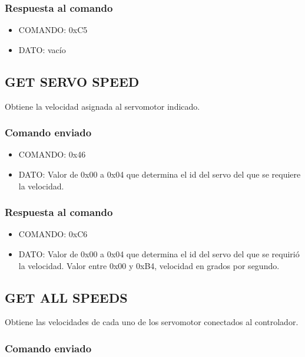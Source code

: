 \documentclass[a4paper,10pt]{article}
\begin{document}
\subsubsection*{Respuesta al comando}

\begin{itemize}
	\item{COMANDO:} 0xC5
	\item{DATO:} vac\'io
\end{itemize}

\subsection{GET SERVO SPEED}
\label{get_servo_speed}

Obtiene la velocidad asignada al servomotor indicado.

\subsubsection*{Comando enviado}

\begin{itemize}
	\item{COMANDO:} 0x46
	\item{DATO:} Valor de 0x00 a 0x04 que determina el id del servo del que se requiere la velocidad.
\end{itemize}

\subsubsection*{Respuesta al comando}

\begin{itemize}
	\item{COMANDO:} 0xC6
	\item{DATO:} Valor de 0x00 a 0x04 que determina el id del servo del que se requiri\'o la velocidad.
	Valor entre 0x00 y 0xB4, velocidad en grados por segundo.
\end{itemize}

\subsection{GET ALL SPEEDS}
\label{get_all_speeds}

Obtiene las velocidades de cada uno de los servomotor conectados al controlador.

\subsubsection*{Comando enviado}
\end{document}
